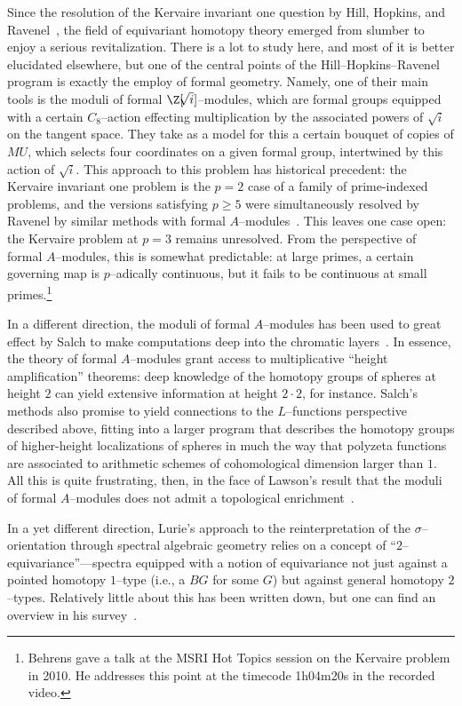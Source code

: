 Since the resolution of the Kervaire invariant one question by Hill, Hopkins, and Ravenel~\cite{HHR}, the field of equivariant homotopy theory emerged from slumber to enjoy a serious revitalization.  There is a lot to study here, and most of it is better elucidated elsewhere, but one of the central points of the Hill--Hopkins--Ravenel program is exactly the employ of formal geometry.  Namely, one of their main tools is the moduli of formal \(\Z[\!\!\sqrt{i}]\)--modules, which are formal groups equipped with a certain \(C_8\)--action effecting multiplication by the associated powers of \(\!\!\sqrt{i}\) on the tangent space.  They take as a model for this a certain bouquet of copies of \(MU\), which selects four coordinates on a given formal group, intertwined by this action of \(\!\!\sqrt{i}\).  This approach to this problem has historical precedent: the Kervaire invariant one problem is the \(p = 2\) case of a family of prime-indexed problems, and the versions satisfying \(p \ge 5\) were simultaneously resolved by Ravenel by similar methods with formal \(A\)--modules~\cite{RavenelNonexistenceArfInvariantElts}.  This leaves one case open: the Kervaire problem at \(p = 3\) remains unresolved.  From the perspective of formal \(A\)--modules, this is somewhat predictable: at large primes, a certain governing map is \(p\)--adically continuous, but it fails to be continuous at small primes.\footnote{Behrens gave a talk at the MSRI Hot Topics session on the Kervaire problem in 2010.  He addresses this point at the timecode 1h04m20s in the recorded video.}

In a different direction, the moduli of formal \(A\)--modules has been used to great effect by Salch to make computations deep into the chromatic layers~\cite{Salch}.  In essence, the theory of formal \(A\)--modules grant access to multiplicative ``height amplification'' theorems: deep knowledge of the homotopy groups of spheres at height \(2\) can yield extensive information at height \(2 \cdot 2\), for instance.  Salch's methods also promise to yield connections to the \(L\)--functions perspective described above, fitting into a larger program that describes the homotopy groups of higher-height localizations of spheres in much the way that polyzeta functions are associated to arithmetic schemes of cohomological dimension larger than \(1\).  All this is quite frustrating, then, in the face of Lawson's result that the moduli of formal \(A\)--modules does not admit a topological enrichment~\cite{LawsonRealizability}.

In a yet different direction, Lurie's approach to the reinterpretation of the \(\sigma\)--orientation through spectral algebraic geometry relies on a concept of ``\(2\)--equivariance''---spectra equipped with a notion of equivariance not just against a pointed homotopy \(1\)--type (i.e., a \(BG\) for some \(G\)) but against general homotopy \(2\)--types.  Relatively little about this has been written down, but one can find an overview in his survey~\cite[Section 5.3]{LurieSurveyOfEll}.



